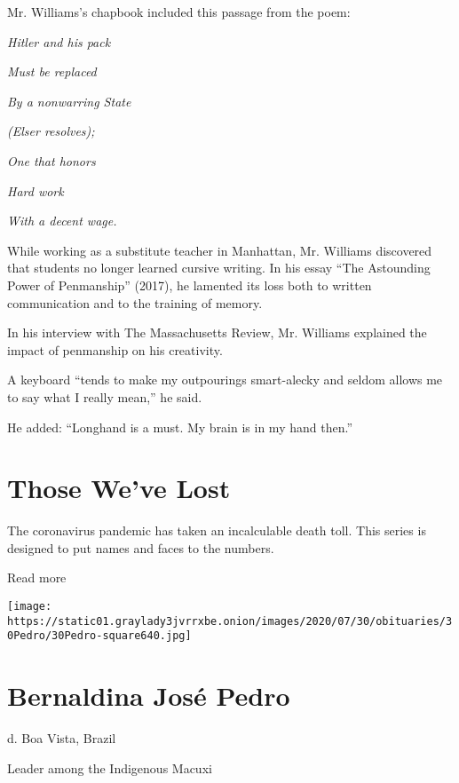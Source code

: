 Mr. Williams's chapbook included this passage from the poem:

\emph{Hitler and his pack}

\emph{Must be replaced}

\emph{By a nonwarring State}

\emph{(Elser resolves);}

\emph{One that honors}

\emph{Hard work}

\emph{With a decent wage.}

While working as a substitute teacher in Manhattan, Mr. Williams
discovered that students no longer learned cursive writing. In his essay
``The Astounding Power of Penmanship'' (2017), he lamented its loss both
to written communication and to the training of memory.

In his interview with The Massachusetts Review, Mr. Williams explained
the impact of penmanship on his creativity.

A keyboard ``tends to make my outpourings smart-alecky and seldom allows
me to say what I really mean,'' he said.

He added: ``Longhand is a must. My brain is in my hand then.''

\href{https://www.nytimes3xbfgragh.onion/interactive/2020/obituaries/people-died-coronavirus-obituaries.html?action=click\&pgtype=Article\&state=default\&region=BELOW_MAIN_CONTENT\&context=covid_obits_promo}{}

\hypertarget{those-weve-lost}{%
\section{Those We've Lost}\label{those-weve-lost}}

The coronavirus pandemic has taken an incalculable death toll. This
series is designed to put names and faces to the numbers.

Read more

\texttt{[image: https://static01.graylady3jvrrxbe.onion/images/2020/07/30/obituaries/30Pedro/30Pedro-square640.jpg]}

\hypertarget{bernaldina-josuxe9-pedro}{%
\section{Bernaldina José Pedro}\label{bernaldina-josuxe9-pedro}}

d. Boa Vista, Brazil

Leader among the Indigenous Macuxi

